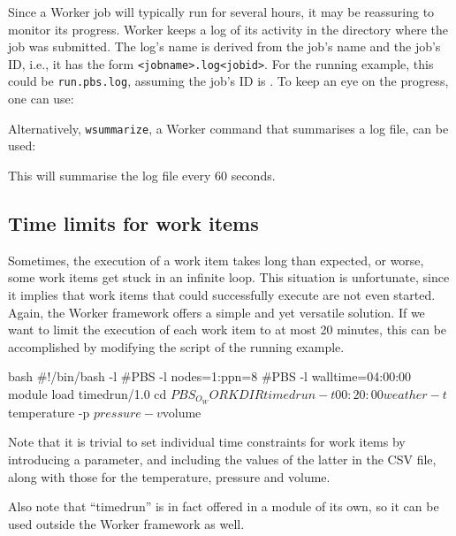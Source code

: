 Since a Worker job will typically run for several hours, it may be reassuring
to monitor its progress. Worker keeps a log of its activity in the directory
where the job was submitted. The log's name is derived from the job's name and
the job's ID, i.e., it has the form \lstinline|<jobname>.log<jobid>|. For the
running example, this could be \texttt{run.pbs.log\jobnumber}, assuming the job's ID is
\jobnumber. To keep an eye on the progress, one can use:

\begin{prompt}
\end{prompt}

Alternatively, \lstinline|wsummarize|, a Worker command that summarises a log file, can be used:

\begin{prompt}
\end{prompt}

This will summarise the log file every 60 seconds.

\subsection{Time limits for work items}

Sometimes, the execution of a work item takes long than expected, or worse,
some work items get stuck in an infinite loop. This situation is unfortunate,
since it implies that work items that could successfully execute are not even
started. Again, the Worker framework offers a simple and yet versatile
solution. If we want to limit the execution of each work item to at most 20
minutes, this can be accomplished by modifying the script of the running
example.

\begin{code}{bash}
#!/bin/bash -l
#PBS -l nodes=1:ppn=8
#PBS -l walltime=04:00:00
module load timedrun/1.0
cd $PBS_O_WORKDIR
timedrun -t 00:20:00 weather -t $temperature  -p $pressure  -v $volume
\end{code}

Note that it is trivial to set individual time constraints for work items by
introducing a parameter, and including the values of the latter in the CSV
file, along with those for the temperature, pressure and volume.

Also note that ``timedrun'' is in fact offered in a module of its own, so it can
be used outside the Worker framework as well.

